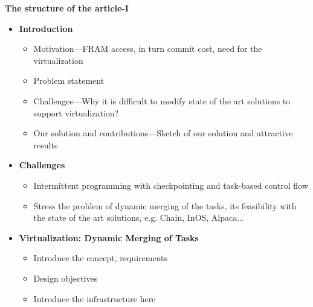 \begin{frame}{\textbf{The structure of the article-I}}
	
	\begin{itemize}
		\item \textbf{Introduction}
		\begin{itemize}
			\item Motivation---FRAM access, in turn commit cost, need for the virtualization
			\item Problem statement
			\item Challenges---Why it is difficult to modify state of the art solutions to support virtualization?
			\item Our solution and contributions---Sketch of our solution and attractive results
		\end{itemize}
		\item \textbf{Challenges}
	\begin{itemize}
		\item Intermittent programming with checkpointing and task-based control flow
		\item Stress the problem of dynamic merging of the tasks, its feasibility with the state of the art solutions, e.g. Chain, InOS, Alpaca...
	\end{itemize}
	
		\item \textbf{Virtualization: Dynamic Merging of Tasks}
		\begin{itemize}
			\item Introduce the concept, requirements
			\item Design objectives
			\item Introduce the infrastructure here
		\end{itemize}
	\end{itemize}
	
\end{frame}


